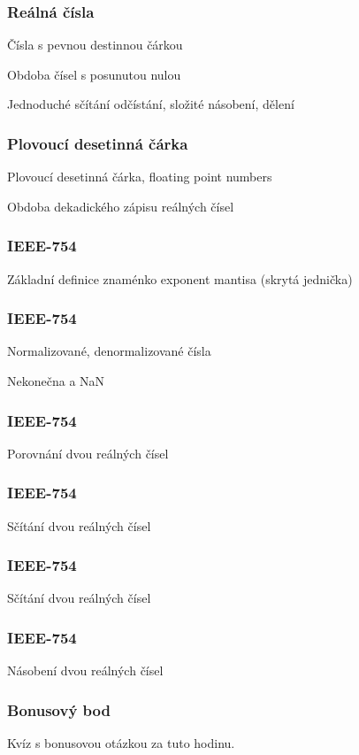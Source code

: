 \documentclass{beamer}
\begin{document}
\begin{frame}
\frametitle{Reálná čísla}

Čísla s pevnou destinnou čárkou

Obdoba čísel s posunutou nulou

Jednoduché sčítání odčístání, složité násobení, dělení
\end{frame}

\begin{frame}
\frametitle{Plovoucí desetinná čárka}

Plovoucí desetinná čárka, floating point numbers

Obdoba dekadického zápisu reálných čísel

\end{frame}

\begin{frame}
\frametitle{IEEE-754}

Základní definice znaménko exponent mantisa (skrytá jednička) 
\end{frame}


\begin{frame}
\frametitle{IEEE-754}

Normalizované, denormalizované čísla

Nekonečna a NaN
\end{frame}

\begin{frame}
\frametitle{IEEE-754}

Porovnání dvou reálných čísel

\end{frame}


\begin{frame}
\frametitle{IEEE-754}

Sčítání dvou reálných čísel

\end{frame}


\begin{frame}
\frametitle{IEEE-754}

Sčítání dvou reálných čísel

\end{frame}

\begin{frame}
\frametitle{IEEE-754}

Násobení dvou reálných čísel

\end{frame}

\begin{frame}
\frametitle{Bonusový bod}

Kvíz s bonusovou otázkou za tuto hodinu.

\end{frame}
\end{document}

